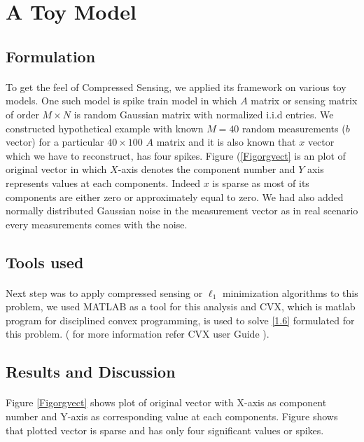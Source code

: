 \section{A Toy Model}
\label{s:toymodel}

\subsection{Formulation}
\label{s:toy_formalism}

\paragraph{}To get the feel of Compressed Sensing, we applied its framework on various toy models. 
One such model is spike train model in which $A$ matrix or sensing matrix of order $M \times N$ is 
random Gaussian matrix with normalized i.i.d entries. We constructed hypothetical example with known $M=40$ 
random measurements ($b$ vector) for a particular $40 \times 100$ $A$ matrix and it is also known that $x$ 
vector which we have to reconstruct, has four spikes. Figure (\ref{Figorgvect} is an plot of original vector
in which $X$-axis denotes the component number and $Y$ axis represents values at each components. Indeed  
$x$ is sparse as most of its components are either zero or approximately equal to zero. We had also added 
normally distributed Gaussian noise in the measurement vector as in real scenario every measurements comes with the noise.


\subsection{Tools used}
\label{s:toy_tools}
\paragraph{}Next step was to apply compressed sensing or $\ell_1$ minimization algorithms to this problem, we used MATLAB 
as a tool for this analysis and CVX, which is matlab program for disciplined convex programming, is used to solve \ref{1.6}
formulated for this problem. ( for more information refer CVX user Guide ).

\subsection{Results and Discussion}
\label{s:toy_results}
\paragraph{}Figure \ref{Figorgvect} shows plot of original vector with X-axis as component number and 
Y-axis as corresponding value at each components. Figure shows that plotted vector is sparse and has 
only four significant values or spikes. 
